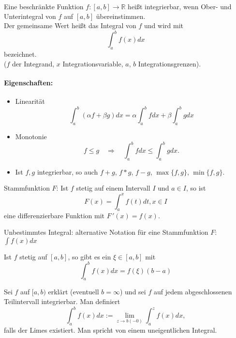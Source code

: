 \documentclass[a4paper,12pt,DIV15]{scrartcl}
\begin{document}
\begin{defn}
Eine beschränkte Funktion $f:[a,b] \rightarrow \mathbb{R}$ heißt {\color{red}
integrierbar}, wenn Ober- und Unterintegral von $f$ auf $[a,b]$ übereinstimmen.\\
Der gemeinsame Wert heißt das {\color{red} Integral} von $f$ und wird mit 
\[ \int_a^b f(x)dx \]
bezeichnet.\\ 
($f$ der Integrand, $x$ Integrationsvariable, $a$, $b$ Integrationsgrenzen).
\end{defn}

\paragraph{Eigenschaften:}
\begin{itemize}
\item Linearität
\[ \int_a^b (\alpha f + \beta g) dx = \alpha \int_a^b fdx + \beta
\int_a^b g dx \]
\item Monotonie
\[  f \leq g \quad \Rightarrow \quad \int_a^b f dx \leq \int_a^b g
dx.\]
\item Ist $f,g$ integrierbar, so auch $f+g$, $f*g$, $f-g$,
$\max\{f,g\}$, $\min \{f,g \}$. 
\end{itemize}

\begin{thm}
{\color{red} Stammfunktion} $F$: Ist $f$ stetig auf einem Intervall $I$ und $a \in I$, so ist 
\[F(x)= \int_a^x f(t) dt, x \in I \] eine differenzierbare Funktion mit
$F\,'(x)=f(x)$. 
\end{thm}
\begin{thm}
{\color{red}Unbestimmtes Integral}: alternative Notation für eine Stammfunktion $F$:  $\int f(x) dx$ 
\end{thm}
\begin{thm}
Ist $f$ stetig auf $[a,b]$, so gibt es ein $\xi \in [a,b]$ mit
\[\int_a^b f(x)dx = f(\xi) (b-a)\]
\end{thm}



\begin{defn}
Sei $f$ auf $[a,b)$ erklärt (eventuell $b=\infty$) und sei $f$ auf jedem
abgeschlossenen Teilintervall integrierbar. Man definiert
\[  \int_a^b f(x)dx := \lim_{z \rightarrow b (-0)} \int_a^z f(x)dx,\]
falls der Limes existiert. Man spricht von einem {\color{red}
uneigentlichen Integral}.
\end{defn}
\end{document}
